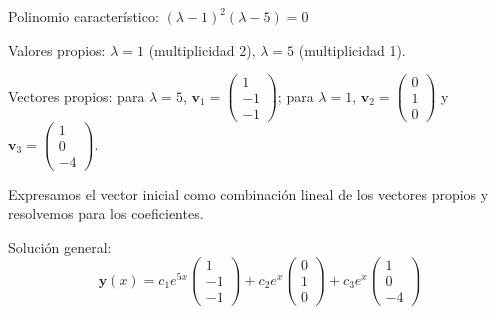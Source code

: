 \begin{prob}
\begin{enumerate}[$(a)$]
\begin{myproof}
Polinomio característico: $(\lambda-1)^2(\lambda-5) = 0$

Valores propios: $\lambda=1$ (multiplicidad 2), $\lambda=5$ (multiplicidad 1).

Vectores propios: para $\lambda=5$, $\mathbf{v}_1 = \begin{pmatrix} 1 \\ -1 \\ -1 \end{pmatrix}$; para $\lambda=1$, $\mathbf{v}_2 = \begin{pmatrix} 0 \\ 1 \\ 0 \end{pmatrix}$ y $\mathbf{v}_3 = \begin{pmatrix} 1 \\ 0 \\ -4 \end{pmatrix}$.

Expresamos el vector inicial como combinación lineal de los vectores propios y resolvemos para los coeficientes.

Solución general:
\[
\mathbf{y}(x) = c_1 e^{5x} \begin{pmatrix} 1 \\ -1 \\ -1 \end{pmatrix} + c_2 e^{x} \begin{pmatrix} 0 \\ 1 \\ 0 \end{pmatrix} + c_3 e^{x} \begin{pmatrix} 1 \\ 0 \\ -4 \end{pmatrix}
\]
\end{myproof}
\end{enumerate}
\end{prob}


